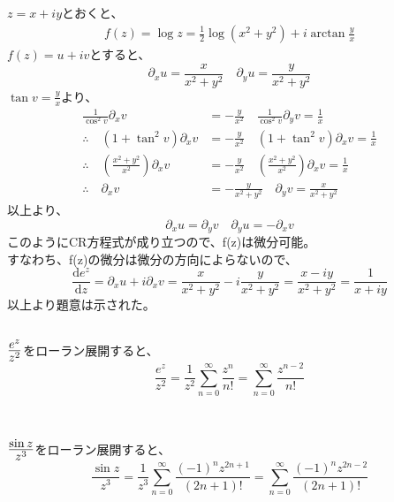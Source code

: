 \documentclass[dvipdfmx,a4paper]{jsarticle}
\begin{document}
\subsection{}
$z = x + iy$とおくと、
\begin{align*}
f(z) = \log{z} = \frac{1}{2}\log{(x^2 + y^2)} + i\arctan{\frac{y}{x}}
\end{align*}
$f(z) = u + iv$とすると、
$$
\partial_x u =  \frac{x}{x^2 + y^2}\quad \partial_y u =  \frac{y}{x^2 + y^2}
$$
$\tan{v} = \frac{y}{x}$より、
\begin{align*}
\frac{1}{\cos^2{v}}\partial_x v &= -\frac{y}{x^2}\quad \frac{1}{\cos^2{v}}\partial_y v = \frac{1}{x}\\
\therefore \quad(1 + \tan^2{v})\partial_x v &= -\frac{y}{x^2}\quad (1 + \tan^2{v})\partial_x v = \frac{1}{x}\\
\therefore \quad(\frac{x^2 + y^2}{x^2})\partial_x v &= -\frac{y}{x^2}\quad (\frac{x^2 + y^2}{x^2})\partial_x v = \frac{1}{x}\\
\therefore \quad\partial_x v &= -\frac{y}{x^2 + y^2}\quad\partial_y v = \frac{x}{x^2 + y^2}
\end{align*}
以上より、
$$
\partial_x u = \partial_y v\quad \partial_y u = -\partial_x v
$$
このようにCR方程式が成り立つので、f(z)は微分可能。\\
 すなわち、f(z)の微分は微分の方向によらないので、
 $$\frac{\mathrm{d}e^z}{\mathrm{d}z} = \partial_x u + i\partial_x v = \frac{x}{x^2 + y^2} - i\frac{y}{x^2 + y^2} = \frac{x-iy}{x^2 + y^2} = \frac{1}{x + iy}$$
 以上より題意は示された。\\
 
 \subsection{}
 $\mbox{\Large$\frac{e^z}{z^2}$}$をローラン展開すると、
 $$
 \frac{e^z}{z^2} = \frac{1}{z^2}\sum_{n = 0}^{\infty} \frac{z^n}{n!} = \sum_{n = 0}^{\infty} \frac{z^{n-2}}{n!}
 $$
 \\
 
 \subsection{}
 $\mbox{\Large$\frac{\sin{z}}{z^3}$}$をローラン展開すると、
 $$
 \frac{\sin{z}}{z^3} = \frac{1}{z^3}\sum_{n = 0}^{\infty} \frac{(-1)^{n}z^{2n + 1}}{(2n + 1)!} = \sum_{n = 0}^{\infty} \frac{(-1)^{n}z^{2n-2}}{(2n + 1)!}
 $$
 \\
 
\end{document}
